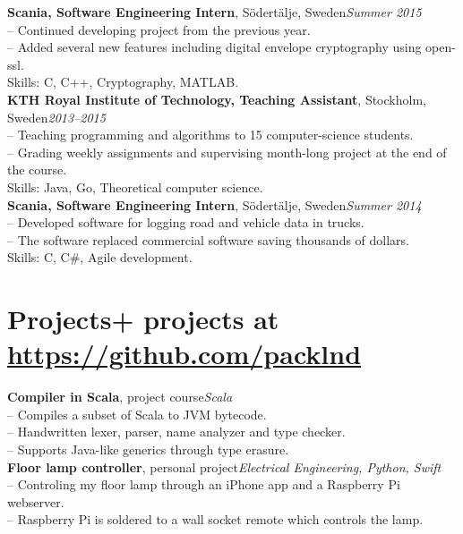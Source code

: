 \documentclass[10pt]{article}
\begin{document}
\noindent\textbf{Scania, Software Engineering Intern}, Södertälje, Sweden\hfill\textit{Summer 2015}\\
\indent-- Continued developing project from the previous year.\\
\indent-- Added several new features including digital envelope cryptography using open-ssl.\\
\indent Skills: C, C++, Cryptography, MATLAB. \\

\noindent\textbf{KTH Royal Institute of Technology, Teaching Assistant}, Stockholm, Sweden\hfill\textit{2013--2015}\\
\indent-- Teaching programming and algorithms to 15 computer-science students.\\
\indent-- Grading weekly assignments and supervising month-long project at the end of the course. \\
\indent Skills: Java, Go, Theoretical computer science. \\

\noindent\textbf{Scania, Software Engineering Intern}, Södertälje, Sweden\hfill\textit{Summer 2014}\\
\indent-- Developed software for logging road and vehicle data in trucks.\\
\indent-- The software replaced commercial software saving thousands of dollars.\\
\indent Skills: C, C\#, Agile development.\\

\section*{Projects\hfill {\normalsize{}+ projects at \url{https://github.com/packlnd}}}
\hline
\vspace{0.10em}
\noindent\textbf{Compiler in Scala}, project course\hfill\textit{Scala}\\
\indent-- Compiles a subset of Scala to JVM bytecode.\\
\indent-- Handwritten lexer, parser, name analyzer and type checker.\\
\indent-- Supports Java-like generics through type erasure.\\

\noindent\textbf{Floor lamp controller}, personal project\hfill\textit{Electrical Engineering, Python, Swift}\\
\indent-- Controling my floor lamp through an iPhone app and a Raspberry Pi webserver.\\
\indent-- Raspberry Pi is soldered to a wall socket remote which controls the lamp.\\
\end{document}
